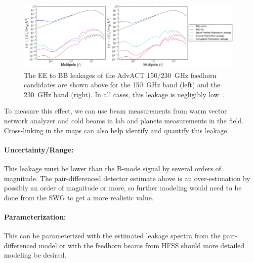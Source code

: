 \begin{figure}[h!]
\centering
\includegraphics[width=\textwidth]{figures/HF_EB_leakage.pdf}
\caption{The EE to BB leakages of the AdvACT 150/230~GHz feedhorn candidates are shown above for the 150~GHz band (left) and the 230~GHz band (right). In all cases, this leakage is negligibly low~\cite{Simon_Thesis_2016}.}
\label{fig:HF_EB_leakage}
\end{figure}

To measure this effect, we can use beam measurements from warm vector network analyzer and cold beams in lab and planets measurements in the field. Cross-linking in the maps can also help identify and quantify this leakage.

\paragraph{Uncertainty/Range:}
This leakage must be lower than the B-mode signal by several orders of magnitude. The pair-differenced detector estimate above is an over-estimation by possibly an order of magnitude or more, so further modeling would need to be done from the SWG to get a more realistic value.

\paragraph{Parameterization:}
This can be parameterized with the estimated leakage spectra from the pair-differenced model or with the feedhorn beams from HFSS should more detailed modeling be desired.

